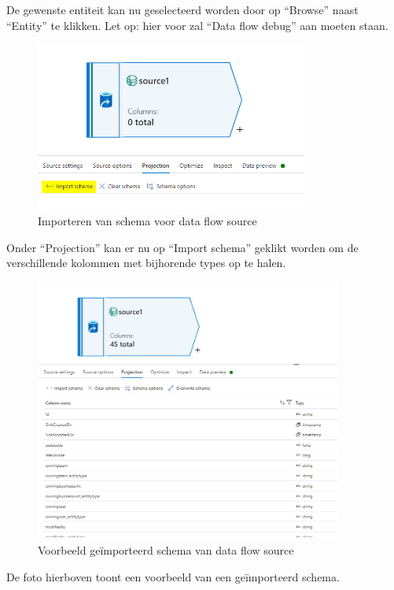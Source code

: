 De gewenste entiteit kan nu geselecteerd worden door op ``Browse'' naast ``Entity'' te klikken. Let op: hier voor zal ``Data flow debug'' aan moeten staan.

\begin{figure}[H]
    \centering
    \includegraphics[width=0.8\textwidth]{./graphics/adf/source_table_6_specific.png}
    \caption{Importeren van schema voor data flow source}
\end{figure}

Onder ``Projection'' kan er nu op ``Import schema'' geklikt worden om de verschillende kolommen met bijhorende types op te halen.

\begin{figure}[H]
    \centering
    \includegraphics[width=0.9\textwidth]{./graphics/adf/source_table_7_specific.png}
    \caption{Voorbeeld geïmporteerd schema van data flow source}
\end{figure}

De foto hierboven toont een voorbeeld van een geïmporteerd schema.

